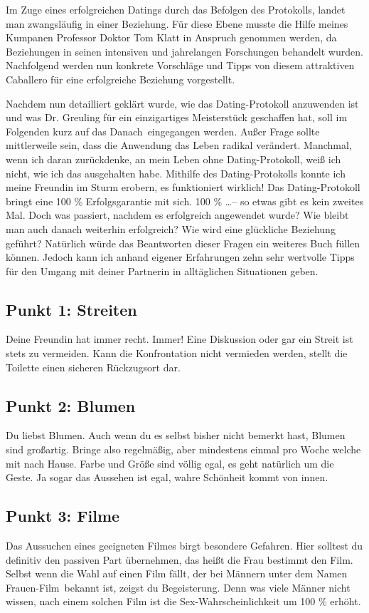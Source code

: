 Im Zuge eines erfolgreichen Datings durch das Befolgen des Protokolls, landet man zwangsläufig in einer Beziehung.
Für diese Ebene musste die Hilfe meines Kumpanen Professor Doktor Tom Klatt in Anspruch genommen werden, da Beziehungen in seinen intensiven und jahrelangen Forschungen behandelt wurden.
Nachfolgend werden nun konkrete Vorschläge und Tipps von diesem attraktiven Caballero für eine erfolgreiche Beziehung vorgestellt.

Nachdem nun detailliert geklärt wurde, wie das Dating-Protokoll anzuwenden ist und was Dr. Greuling für ein einzigartiges Meisterstück geschaffen hat, soll im Folgenden kurz auf das \glqq Danach\grqq~eingegangen werden. 
Außer Frage sollte mittlerweile sein, dass die Anwendung das Leben radikal verändert. Manchmal, wenn ich daran zurückdenke, an mein Leben ohne Dating-Protokoll, weiß ich nicht, wie ich das ausgehalten habe. 
Mithilfe des Dating-Protokolls konnte ich meine Freundin im Sturm erobern, es funktioniert wirklich! 
Das Dating-Protokoll bringt eine 100 \% Erfolgsgarantie mit sich. 
100 \% \dots – so etwas gibt es kein zweites Mal.
Doch was passiert, nachdem es erfolgreich angewendet wurde? 
Wie bleibt man auch danach weiterhin erfolgreich? 
Wie wird eine glückliche Beziehung geführt? 
Natürlich würde das Beantworten dieser Fragen ein weiteres Buch füllen können. 
Jedoch kann ich anhand eigener Erfahrungen zehn sehr wertvolle Tipps für den Umgang mit deiner Partnerin in alltäglichen Situationen geben. 

\subsection{Punkt 1: Streiten}
Deine Freundin hat immer recht. Immer! Eine Diskussion oder gar ein Streit ist stets zu vermeiden. Kann die Konfrontation nicht vermieden werden, stellt die Toilette einen sicheren Rückzugsort dar.

\subsection{Punkt 2: Blumen}
Du liebst Blumen. Auch wenn du es selbst bisher nicht bemerkt hast, Blumen sind großartig. Bringe also regelmäßig, aber mindestens einmal pro Woche welche mit nach Hause. Farbe und Größe sind völlig egal, es geht natürlich um die Geste. Ja sogar das Aussehen ist egal, wahre Schönheit kommt von innen.

\subsection{Punkt 3: Filme}
Das Aussuchen eines geeigneten Filmes birgt besondere Gefahren. 
Hier solltest du definitiv den passiven Part übernehmen, das heißt die Frau bestimmt den Film. 
Selbst wenn die Wahl auf einen Film fällt, der bei Männern unter dem Namen \glqq Frauen-Film\grqq~bekannt ist, zeigst du Begeisterung. 
Denn was viele Männer nicht wissen, nach einem solchen Film ist die Sex-Wahrscheinlichkeit um 100 \% erhöht.

